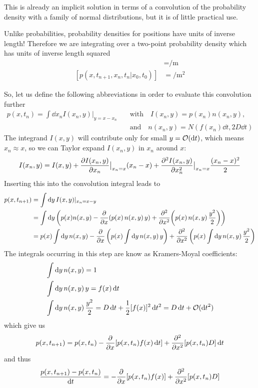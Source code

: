 \documentclass{notebook}
\begin{document}
This is already an implicit solution in terms of a convolution of the probability density with a family of normal distributions, but it is of little practical use. 
%
\begin{remark}
	Unlike probabilities, probability densities for positions have units of inverse length! Therefore we are integrating over a two-point probability density which has units of inverse length squared
	\begin{align*}
		[p(x,t_{n+1}|x_0,t_0)] &= \si{\per \meter} \\
		[p(x,t_{n+1},x_n,t_n|x_0,t_0)] &= \si{\per \meter \squared}
	\end{align*}
\end{remark}
%
So, let us define the following abbreviations in order to evaluate this convolution further 
%
\begin{align*}
	p(x,t_n) = \int \dd x_n I(x_n, y) |_{y = x-x_n} \quad &\mathrm{with} \quad I(x_n,y) = p(x_n) n(x_n,y), \\ 
	&\mathrm{and} \quad n(x_n,y) = N(f(x_n) \dd t, 2 D \dd t)
\end{align*}
%
The integrand $I(x,y)$ will contribute only for small $y = \mathcal{O}(\dd t)$, which means $x_n \approx x$, so we can Taylor expand $I(x_n,y)$ in $x_n$ around $x$:
%
\begin{equation}
I(x_n,y) = I(x,y) + \pdv{I(x_n,y)}{x_n} \big|_{x_n = x} (x_n-x) + \pdv[2]{I(x_n,y)}{x_n} \big|_{x_n = x} \frac{(x_n-x)^2}{2}
\end{equation}
%
Inserting this into the convolution integral leads to
%
\begin{align*}
	p(x,t_{n+1}) &= \int{\dd{y} I(x,y)|_{x_n = x-y}} \\
	&= \int\dd y \left( p(x) n(x,y) - \pdv{x} (p(x) \, n(x,y) \, y ) + \pdv[2]{x} (p(x) \, n(x,y) \, \frac{y^2}{2})\right) \\
	&= p(x) \int \dd{y} n(x,y) - \pdv{x} \left(p(x) \int \dd{y} n(x,y) \, y \right) + \pdv[2]{x} \left(p(x) \int \dd{y} n(x,y) \, \frac{y^2}{2} \right)
\end{align*}
%
The integrals occurring in this step are know as Kramers-Moyal coefficients:
%
\begin{align*}
	&\int \dd{y} n(x,y) = 1 \\
	&\int \dd{y} n(x,y) \, y = f(x) \dd{t} \\
	&\int \dd{y} n(x,y) \, \frac{y^2}{2} = D \dd{t} + \frac{1}{2}[f(x)]^2 \dd{t^2} = D \dd{t} + \mathcal{O}(\dd{t}^2)
\end{align*}
%
which give us
%
\begin{equation}
p(x,t_{n+1}) = p(x,t_n) - \pdv{x} [p(x,t_n) f(x) \dd{t}] + \pdv[2]{x}[p(x,t_n) D]\dd{t}
\end{equation}
%
and thus
%
\begin{equation}
\frac{p(x,t_{n+1}) - p(x,t_n)}{\dd{t}} =  -\pdv{x} [p(x,t_n) f(x)] + \pdv[2]{x}[p(x,t_n) D]
\end{equation}
%
\end{document}
